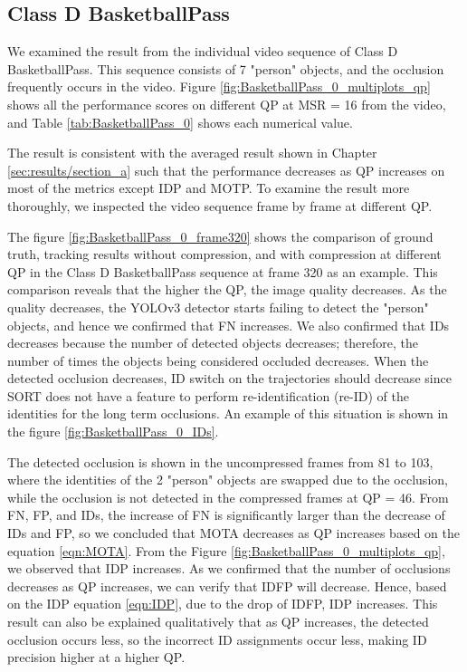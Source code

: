 \subsection{Class D BasketballPass}
We examined the result from the individual video sequence of Class D BasketballPass. This sequence consists of 7 "person" objects, and the occlusion frequently occurs in the video.  Figure \ref{fig:BasketballPass_0_multiplots_qp} shows all the performance scores on different QP at MSR = 16 from the video, and Table \ref{tab:BasketballPass_0} shows each numerical value. 


The result is consistent with the averaged result shown in Chapter \ref{sec:results/section_a} such that the performance decreases as QP increases on most of the metrics except IDP and MOTP. To examine the result more thoroughly, we inspected the video sequence frame by frame at different QP.

The figure \ref{fig:BasketballPass_0_frame320} shows the comparison of ground truth, tracking results without compression, and with compression at different QP in the Class D BasketballPass sequence at frame 320 as an example. This comparison reveals that the higher the QP, the image quality decreases. As the quality decreases, the YOLOv3 detector starts failing to detect the "person" objects, and hence we confirmed that FN increases. We also confirmed that IDs decreases because the number of detected objects decreases; therefore, the number of times the objects being considered occluded decreases. When the detected occlusion decreases, ID switch on the trajectories should decrease since SORT does not have a feature to perform re-identification (re-ID) of the identities for the long term occlusions. An example of this situation is shown in the figure \ref{fig:BasketballPass_0_IDs}.

The detected occlusion is shown in the uncompressed frames from 81 to 103, where the identities of the 2 "person" objects are swapped due to the occlusion, while the occlusion is not detected in the compressed frames at QP = 46. From FN, FP, and IDs, the increase of FN is significantly larger than the decrease of IDs and FP, so we concluded that MOTA decreases as QP increases based on the equation \ref{eqn:MOTA}. From the Figure \ref{fig:BasketballPass_0_multiplots_qp}, we observed that IDP increases. As we confirmed that the number of occlusions decreases as QP increases, we can verify that IDFP will decrease. Hence, based on the IDP equation \ref{eqn:IDP}, due to the drop of IDFP, IDP increases. This result can also be explained qualitatively that as QP increases, the detected occlusion occurs less, so the incorrect ID assignments occur less, making ID precision higher at a higher QP.

